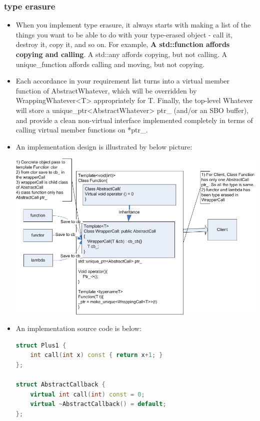 \documentclass[a4paper,11pt,twoside]{book}
\begin{document}
\subsubsection{type erasure}
\begin{itemize}
\item When you implement type erasure, it always starts with making a list of the things you want to be able to do with your type-erased object - call it, destroy it, copy it, and so on. For example, \textbf{A std::function affords copying and calling}. A std::any affords copying, but not calling. A unique\_function affords calling and moving, but not copying.

\item Each accordance in your requirement list turns into a virtual member function of AbstractWhatever, which will be overridden by WrappingWhatever<T> appropriately for T. Finally, the top-level Whatever will store a unique\_ptr<AbstractWhatever> ptr\_ (and/or an SBO buffer), and provide a clean non-virtual interface implemented completely in terms of calling virtual member functions on *ptr\_.

\item An implementation design is illustrated by below picture:

\includegraphics[scale=0.9]{pics/function1.png}

\item An implementation source code is below:
\begin{lstlisting}[frame=single, language=c++]
struct Plus1 {
	int call(int x) const { return x+1; }
};

struct AbstractCallback {
	virtual int call(int) const = 0;
	virtual ~AbstractCallback() = default;
};


\end{lstlisting}
\end{itemize}
\end{document}
